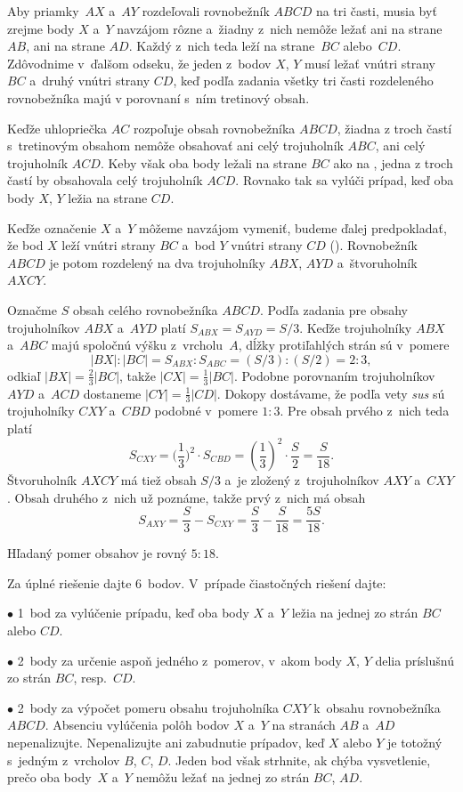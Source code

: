 {%
Aby priamky~$AX$ a~$AY$ rozdeľovali rovnobežník $ABCD$
na tri časti, musia byť zrejme body $X$ a~$Y$ navzájom rôzne
a~žiadny z~nich nemôže ležať ani na strane $AB$, ani na strane $AD$.
Každý z~nich teda leží na strane~$BC$ alebo~$CD$. Zdôvodnime
v~ďalšom odseku, že jeden z~bodov $X$, $Y$ musí
ležať vnútri strany~$BC$ a~druhý vnútri strany $CD$,
keď podľa zadania všetky tri časti rozdeleného rovnobežníka majú
v porovnaní s~ním tretinový obsah.

Keďže uhlopriečka $AC$ rozpoľuje obsah rovnobežníka $ABCD$,
žiadna z troch častí s~tretinovým obsahom nemôže obsahovať ani celý trojuholník $ABC$,
ani celý trojuholník $ACD$. Keby však oba body ležali na strane $BC$
ako na \obr{}, jedna z troch častí by obsahovala celý trojuholník
$ACD$. Rovnako tak sa vylúči prípad, keď oba body $X$, $Y$ ležia na strane
$CD$.
%


Keďže označenie $X$ a~$Y$ môžeme navzájom vymeniť, budeme
ďalej predpokladať, že bod $X$ leží vnútri strany $BC$ a~bod $Y$ vnútri
strany $CD$ (\obr). Rovnobežník $ABCD$ je potom rozdelený na dva trojuholníky
$ABX$, $AY\!D$ a~štvoruholník $AXCY$.
%

Označme $S$ obsah celého rovnobežníka $ABCD$.
Podľa zadania pre obsahy trojuholníkov $ABX$ a~$AY\!D$
platí $S_{ABX}=S_{AY\!D}=S/3$. Keďže
trojuholníky $ABX$ a~$ABC$ majú spoločnú výšku z~vrcholu~$A$, dĺžky
protiľahlých strán sú v~pomere
$$
|BX|:|BC|=S_{ABX}:S_{ABC}=(S/3):(S/2)=2:3,
$$
odkiaľ $|BX|=\frac23|BC|$, takže $|CX|=\frac13|BC|$. Podobne porovnaním trojuholníkov
$AY\!D$ a~$ACD$ dostaneme $|CY|=\frac13|CD|$. Dokopy dostávame, že
podľa vety \emph{sus} sú trojuholníky $CXY$ a~$CBD$ podobné v~pomere $1:3$.
Pre obsah prvého z~nich teda platí
$$
S_{CXY} =
\biggl(\frac 13\biggr)^2 \cdot S_{CBD} =
\left(\frac 13\right)^2 \cdot \frac{S}{2} =
\frac{S}{18}.
$$
Štvoruholník $AXCY$ má tiež obsah $S/3$
a~je zložený z~trojuholníkov $AXY$ a~$CXY$. Obsah druhého z~nich už
poznáme, takže prvý z~nich má obsah
$$
S_{AXY}=\frac{S}{3}-S_{CXY}=\frac{S}{3}-\frac{S}{18}
=\frac{5S}{18}.
$$

\zaver
Hľadaný pomer obsahov je rovný $5:18$.


\schemaABC
Za úplné riešenie dajte 6~bodov. V~prípade čiastočných
riešení dajte:
\item{$\bullet$} 1~bod za vylúčenie prípadu, keď oba body $X$ a~$Y$ ležia na jednej zo strán $BC$ alebo $CD$.
\item{$\bullet$} 2~body za určenie aspoň jedného z~pomerov, v~akom body $X$, $Y$ delia príslušnú zo strán $BC$, resp.~$CD$.
\item{$\bullet$} 2~body za výpočet pomeru obsahu trojuholníka $CXY$ k~obsahu rovnobežníka $ABCD$.
\endgraf\noindent
Absenciu vylúčenia polôh bodov $X$ a~$Y$ na stranách $AB$ a~$AD$
nepenalizujte. Nepenalizujte ani zabudnutie prípadov, keď $X$ alebo
$Y$ je totožný s~jedným z~vrcholov $B$, $C$, $D$. Jeden bod však
strhnite, ak chýba vysvetlenie, prečo oba body~$X$ a~$Y$ nemôžu
ležať na jednej zo strán $BC$, $AD$.
\endschema
}

